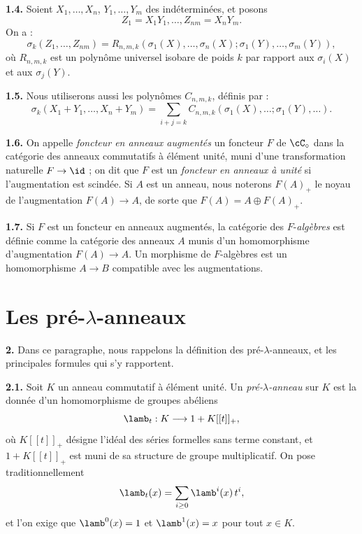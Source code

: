 \smallskip
\noindent\textbf{1.4.} Soient $X_1, \ldots, X_n$, $Y_1, \ldots, Y_m$ des ind\'etermin\'ees, et posons
\[
Z_1 = X_1 Y_1, \ldots, Z_{nm} = X_n Y_m.
\]
On a :
\begin{equation}
\sigma_k(Z_1, \ldots, Z_{nm}) = R_{n,m,k}(\sigma_1(X), \ldots, \sigma_n(X); \sigma_1(Y), \ldots, \sigma_m(Y)),
\end{equation}
o\`u $R_{n,m,k}$ est un polyn\^ome universel isobare de poids $k$ par rapport aux $\sigma_i(X)$ et aux $\sigma_j(Y)$.

\smallskip
\noindent\textbf{1.5.} Nous utiliserons aussi les polyn\^omes $C_{n,m,k}$, d\'efinis par :
\begin{equation}
\sigma_k(X_1 + Y_1, \ldots, X_n + Y_m) = \sum_{i+j=k} C_{n,m,k}(\sigma_1(X), \ldots; \sigma_1(Y), \ldots).
\end{equation}

\smallskip
\noindent\textbf{1.6.} On appelle \emph{foncteur en anneaux augment\'es} un foncteur $F$ de $\cC_\circ$ dans la cat\'egorie des anneaux commutatifs \`a \'el\'ement unit\'e, muni d'une transformation naturelle $F \to \id$ ; on dit que $F$ est un \emph{foncteur en anneaux \`a unit\'e} si l'augmentation est scind\'ee. Si $A$ est un anneau, nous noterons $F(A)_+$ le noyau de l'augmentation $F(A) \to A$, de sorte que $F(A) = A \oplus F(A)_+$.

\smallskip
\noindent\textbf{1.7.} Si $F$ est un foncteur en anneaux augment\'es, la cat\'egorie des $F$-\emph{alg\`ebres} est d\'efinie comme la cat\'egorie des anneaux $A$ munis d'un homomorphisme d'augmentation $F(A) \to A$. Un morphisme de $F$-alg\`ebres est un homomorphisme $A \to B$ compatible avec les augmentations.

\section{Les pr\'e-$\lambda$-anneaux}

\noindent\textbf{2.} Dans ce paragraphe, nous rappelons la d\'efinition des pr\'e-$\lambda$-anneaux, et les principales formules qui s'y rapportent.

\smallskip
\noindent\textbf{2.1.} Soit $K$ un anneau commutatif \`a \'el\'ement unit\'e. Un \emph{pr\'e-$\lambda$-anneau} sur $K$ est la donn\'ee d'un homomorphisme de groupes ab\'eliens
\begin{equation}
\lamb_t : K \longrightarrow 1 + K[[t]]_+,
\end{equation}
o\`u $K[[t]]_+$ d\'esigne l'id\'eal des s\'eries formelles sans terme constant, et $1 + K[[t]]_+$ est muni de sa structure de groupe multiplicatif. On pose traditionnellement
\[
\lamb_t(x) = \sum_{i \geq 0} \lamb^i(x) \, t^i,
\]
et l'on exige que $\lamb^0(x) = 1$ et $\lamb^1(x) = x$ pour tout $x \in K$.

